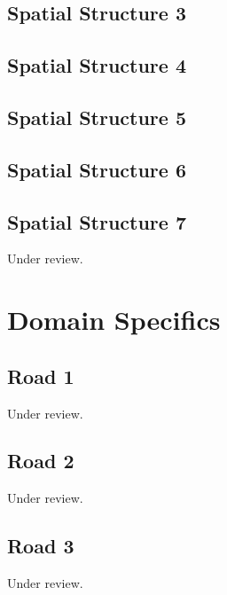 \documentclass{scrartcl}
\begin{document}
\subsection{Spatial Structure 3}
\label{sec:spatial_3}
\clearpage

\subsection{Spatial Structure 4}
\label{sec:spatial_4}
\clearpage

\subsection{Spatial Structure 5}
\label{sec:spatial_5}
\clearpage

\subsection{Spatial Structure 6}
\label{sec:spatial_6}
\clearpage

\subsection{Spatial Structure 7}
\label{sec:spatial_7}
Under review.%
\clearpage

\section{Domain Specifics}

\subsection{Road 1}
\label{sec:road_1}
Under review.%
\clearpage

\subsection{Road 2}
\label{sec:road_2}
Under review.%
\clearpage

\subsection{Road 3}
\label{sec:road_3}
Under review.%
\clearpage
\end{document}
